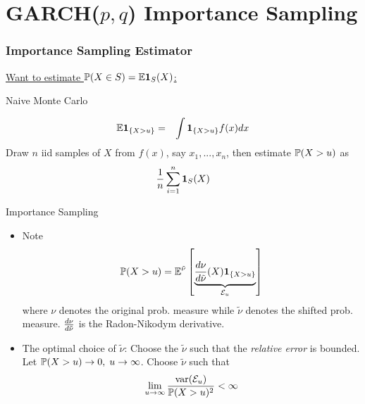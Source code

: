 \documentclass{beamer}
\begin{document}
\section{GARCH($p, q$) Importance Sampling}
\begin{frame}
  \frametitle{Importance Sampling Estimator}
  \underline{\scriptsize{
      Want to estimate $\P(X \in S) = \E \I_S(X)$:}
  }

  \begin{minipage}[t]{0.45\linewidth}
    \textcolor[HTML]{990033}{Naive Monte Carlo}
    \begin{small}
      \begin{eqnarray*}
        \E \1{X > u} &=& \int \1{X > u} f(x) dx
      \end{eqnarray*}
      Draw $n$ iid samples of $X$ from $f(x)$, say $x_1, ..., x_n$,
      then estimate $\P(X > u)$ as
      \[
      {1 \over n} \sum_{i=1}^n \I_S(X)
      \]
    \end{small}
  \end{minipage}\hfill
  \begin{minipage}[t]{0.5\linewidth}
    \textcolor[HTML]{990033}{Importance Sampling}
    \begin{scriptsize}
    \begin{itemize}
    \item Note
      \[
      \P(X > u)
      =
      \E^{\tilde \nu} \left[
        \underbrace{
          \td{\nu}{\tilde \nu}(X) \1{X > u}
        }_{\mathcal E_u}
      \right]
      \]
      where $\nu$ denotes the original prob. measure while $\tilde \nu$
      denotes the shifted prob. measure. $\td{\nu}{\tilde \nu}$ is the
      Radon-Nikodym derivative.
    \item The optimal choice of $\tilde \nu$:
      Choose the $\tilde \nu$ such that the {\em relative error}
      is bounded. Let $\P(X > u) \to 0,\; u \to \infty$. Choose
      $\tilde \nu$ such that
      \[
      \lim_{u \to \infty} {\var({\mathcal E}_u) \over \P(X > u)^2} < \infty
      \]
    \end{itemize}
    \end{scriptsize}
  \end{minipage}
\end{frame}
\end{document}
